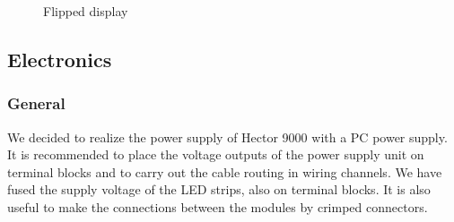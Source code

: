 \documentclass[a4paper]{scrartcl}
\begin{document}
\begin{figure}
 \centering
 \caption{Flipped display} \label{display_half_in}
\end{figure}

\subsection{Electronics}

\subsubsection{General}
We decided to realize the power supply of Hector 9000 with a PC power supply. It is recommended to place the voltage outputs of the power supply unit on terminal blocks and to carry out the cable routing in wiring channels. We have fused the supply voltage of the LED strips, also on terminal blocks. It is also useful to make the connections between the modules by crimped connectors.    
\end{document}
